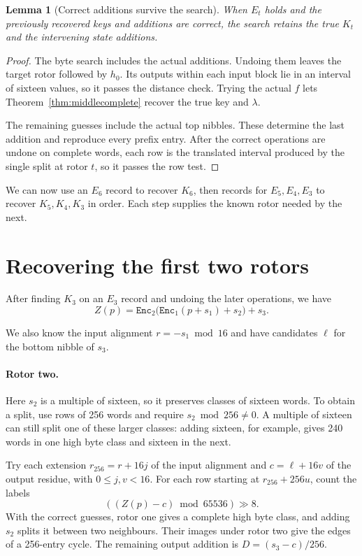 \documentclass[11pt]{article}
\newtheorem{lemma}[theorem]{Lemma}
\begin{document}
\begin{lemma}[Correct additions survive the search]\label{lem:join}
When \(E_t\) holds and the previously recovered keys and additions
are correct, the search retains the true \(K_t\) and the intervening
state additions.
\end{lemma}
\begin{proof}
The byte search includes the actual additions. Undoing them leaves the
target rotor followed by \(h_0\). Its outputs within each input block
lie in an interval of sixteen values, so it passes the distance check.
Trying the actual \(f\) lets Theorem~\ref{thm:middlecomplete} recover
the true key and \(\lambda\).

The remaining guesses include the actual top nibbles. These determine
the last addition and reproduce every prefix entry. After the correct
operations are undone on complete words, each row is the translated
interval produced by the single split at rotor \(t\), so it passes the
row test.
\end{proof}

We can now use an \(E_6\) record to recover \(K_6\), then records for
\(E_5,E_4,E_3\) to recover \(K_5,K_4,K_3\) in order. Each step supplies
the known rotor needed by the next.

\section{Recovering the first two rotors}\label{sec:tail}
After finding \(K_3\) on an \(E_3\) record and undoing the later
operations, we have
\[
 Z(p)=\mathtt{Enc}_2\bigl(\mathtt{Enc}_1(p+s_1)+s_2\bigr)+s_3.
\]

We also know the input alignment \(r=-s_1\bmod16\) and have candidates
\(\ell\) for the bottom nibble of \(s_3\).

\paragraph{Rotor two.}
Here \(s_2\) is a multiple of sixteen, so it preserves classes of
sixteen words. To obtain a split, use rows of 256 words and require
\(s_2\bmod256\ne0\). A multiple of sixteen can still split one of
these larger classes: adding sixteen, for example, gives 240 words
in one high byte class and sixteen in the next.

Try each extension \(r_{256}=r+16j\) of the input alignment and
\(c=\ell+16v\) of the output residue, with \(0\le j,v<16\).
For each row starting at \(r_{256}+256u\), count the labels
\[
 ((Z(p)-c)\bmod65536)\gg8.
\]
With the correct guesses, rotor one gives a complete high byte
class, and adding \(s_2\) splits it between two neighbours.
Their images under rotor two give the edges of a 256-entry cycle.
The remaining output addition is \(D=(s_3-c)/256\).
\end{document}
